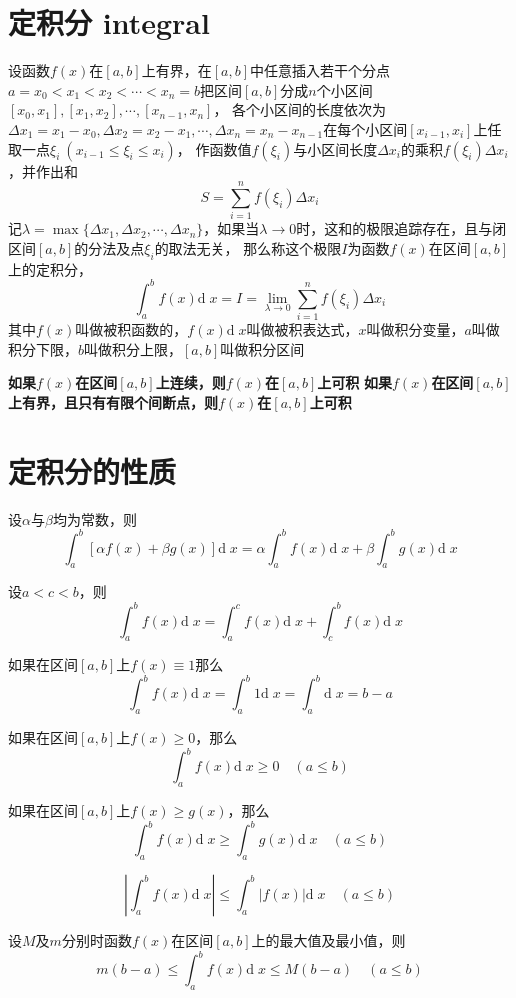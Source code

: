 \documentclass[UTF8]{ctexart}
\newcommand{\dif}[1]{\text{d}\;\!#1}
\begin{document}
\section*{定积分 integral}

\bigskip

设函数$f(x)$在$[a,b]$上有界，在$[a,b]$中任意插入若干个分点$a=x_0<x_1<x_2<\cdots<x_n=b$把区间$[a,b]$分成$n$个小区间$[x_0,x_1],[x_1,x_2],\cdots,[x_{n-1},x_n]$，
各个小区间的长度依次为$\Delta x_1 = x_1-x_0,\Delta x_2 = x_2-x_1,\cdots,\Delta x_n = x_n-x_{n-1}$在每个小区间$[x_{i-1},x_i]$上任取一点$\xi_i\:(x_{i-1}\le\xi_i\le x_i)$，
作函数值$f(\xi_i)$与小区间长度$\Delta x_i$的乘积$f(\xi_i)\Delta x_i$，并作出和
\[ S=\sum^n_{i=1}f(\xi_i)\Delta x_i \]
记$\lambda=\max\{\Delta x_1,\Delta x_2,\cdots,\Delta x_n\}$，如果当$\lambda\to0$时，这和的极限追踪存在，且与闭区间$[a,b]$的分法及点$\xi_i$的取法无关，
那么称这个极限$I$为函数$f(x)$在区间$[a,b]$上的定积分，
\[\int^b_af(x)\dif{x}=I=\lim_{\lambda\to0}\sum^n_{i=1}f(\xi_i)\Delta x_i\]
其中$f(x)$叫做被积函数的，$f(x)\dif{x}$叫做被积表达式，$x$叫做积分变量，$a$叫做积分下限，$b$叫做积分上限，$[a,b]$叫做积分区间


\bigskip

\textbf{如果$f(x)$在区间$[a,b]$上连续，则$f(x)$在$[a,b]$上可积}
\textbf{如果$f(x)$在区间$[a,b]$上有界，且只有有限个间断点，则$f(x)$在$[a,b]$上可积}

\bigskip
\bigskip

\section*{定积分的性质}

\bigskip

设$\alpha$与$\beta$均为常数，则
\[ \int^b_a[\alpha f(x)+\beta g(x)]\dif{x}=\alpha\int^b_af(x)\dif{x}+\beta\int^b_ag(x)\dif{x} \]

设$a<c<b$，则
\[ \int^b_af(x)\dif{x}=\int^c_af(x)\dif{x}+\int^b_cf(x)\dif{x} \]

如果在区间$[a,b]$上$f(x)\equiv1$那么
\[ \int^b_af(x)\dif{x}=\int^b_a1\dif{x}=\int^b_a\dif{x}=b-a\]

如果在区间$[a,b]$上$f(x)\ge0$，那么
\[ \int^b_af(x)\dif{x}\ge0\quad(a\le b) \]

如果在区间$[a,b]$上$f(x)\ge g(x)$，那么
\[ \int^b_af(x)\dif{x}\ge\int^b_ag(x)\dif{x}\quad(a\le b) \]

\[ \left| \int^b_af(x)\dif{x} \right|\le\int^b_a|f(x)|\dif{x}\quad(a\le b) \]

设$M$及$m$分别时函数$f(x)$在区间$[a,b]$上的最大值及最小值，则
\[ m(b-a)\le\int^b_af(x)\dif{x}\le M(b-a) \quad(a\le b)\]
\end{document}
